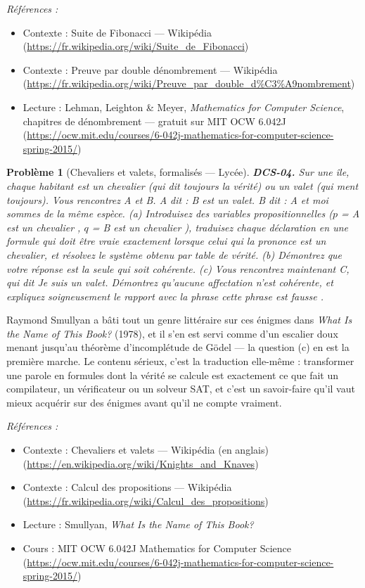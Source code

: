 \documentclass[11pt]{article}
\newtheorem{problem}{Problème}
\newenvironment{refs}{\par\small\noindent\emph{Références :}\begin{itemize}\setlength\itemsep{0pt}}{\end{itemize}\normalsize}
\begin{document}
\begin{refs}
\item Contexte : Suite de Fibonacci --- Wikipédia (\url{https://fr.wikipedia.org/wiki/Suite_de_Fibonacci})
\item Contexte : Preuve par double dénombrement --- Wikipédia (\url{https://fr.wikipedia.org/wiki/Preuve_par_double_d%C3%A9nombrement})
\item Lecture : Lehman, Leighton \& Meyer, \textit{Mathematics for Computer Science}, chapitres de dénombrement --- gratuit sur MIT OCW 6.042J (\url{https://ocw.mit.edu/courses/6-042j-mathematics-for-computer-science-spring-2015/})
\end{refs}

\bigskip

\begin{problem}[{Chevaliers et valets, formalisés --- Lycée}]
\textbf{DCS-04.} Sur une île, chaque habitant est un chevalier (qui dit toujours la vérité) ou un valet (qui ment toujours). Vous rencontrez A et B. A dit : \og{} B est un valet. \fg{} B dit : \og{} A et moi sommes de la même espèce. \fg{} (a) Introduisez des variables propositionnelles ($p$ = \og{} A est un chevalier \fg{}, $q$ = \og{} B est un chevalier \fg{}), traduisez chaque déclaration en une formule qui doit être vraie exactement lorsque celui qui la prononce est un chevalier, et résolvez le système obtenu par table de vérité. (b) Démontrez que votre réponse est la \textit{seule} qui soit cohérente. (c) Vous rencontrez maintenant C, qui dit \og{} Je suis un valet. \fg{} Démontrez qu'aucune affectation n'est cohérente, et expliquez soigneusement le rapport avec la phrase \og{} cette phrase est fausse \fg{}.
\end{problem}

\noindent Raymond Smullyan a bâti tout un genre littéraire sur ces énigmes dans \textit{What Is the Name of This Book?} (1978), et il s'en est servi comme d'un escalier doux menant jusqu'au théorème d'incomplétude de Gödel --- la question (c) en est la première marche. Le contenu sérieux, c'est la traduction elle-même : transformer une parole en formules dont la vérité se calcule est exactement ce que fait un compilateur, un vérificateur ou un solveur SAT, et c'est un savoir-faire qu'il vaut mieux acquérir sur des énigmes avant qu'il ne compte vraiment.

\begin{refs}
\item Contexte : Chevaliers et valets --- Wikipédia (en anglais) (\url{https://en.wikipedia.org/wiki/Knights_and_Knaves})
\item Contexte : Calcul des propositions --- Wikipédia (\url{https://fr.wikipedia.org/wiki/Calcul_des_propositions})
\item Lecture : Smullyan, \textit{What Is the Name of This Book?}
\item Cours : MIT OCW 6.042J Mathematics for Computer Science (\url{https://ocw.mit.edu/courses/6-042j-mathematics-for-computer-science-spring-2015/})
\end{refs}
\end{document}
